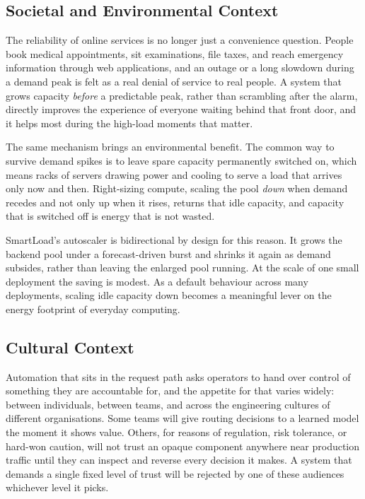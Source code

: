 \subsection{Societal and Environmental Context}
\label{sec:intro:society}

The reliability of online services is no longer just a convenience question.
People book medical appointments, sit examinations, file taxes, and reach
emergency information through web applications, and an outage or a long slowdown
during a demand peak is felt as a real denial of service to real people. A system
that grows capacity \emph{before} a predictable peak, rather than scrambling
after the alarm, directly improves the experience of everyone waiting behind that
front door, and it helps most during the high-load moments that matter.

The same mechanism brings an environmental benefit. The common way to survive
demand spikes is to leave spare capacity permanently switched on, which means
racks of servers drawing power and cooling to serve a load that arrives only now
and then. Right-sizing compute, scaling the pool \emph{down} when demand recedes
and not only up when it rises, returns that idle capacity, and capacity that is
switched off is energy that is not wasted.

SmartLoad's autoscaler is bidirectional by design for this reason. It grows the
backend pool under a forecast-driven burst and shrinks it again as demand
subsides, rather than leaving the enlarged pool running. At
the scale of one small deployment the saving is modest. As a default behaviour
across many deployments, scaling idle capacity down becomes a meaningful lever on
the energy footprint of everyday computing.

\subsection{Cultural Context}
\label{sec:intro:culture}

Automation that sits in the request path asks operators to hand over control of
something they are accountable for, and the appetite for that varies widely:
between individuals, between teams, and across the engineering cultures of
different organisations. Some teams will give routing decisions to a learned
model the moment it shows value. Others, for reasons of regulation, risk
tolerance, or hard-won caution, will not trust an opaque component anywhere near
production traffic until they can inspect and reverse every decision it makes. A
system that demands a single fixed level of trust will be rejected by one of these
audiences whichever level it picks.

